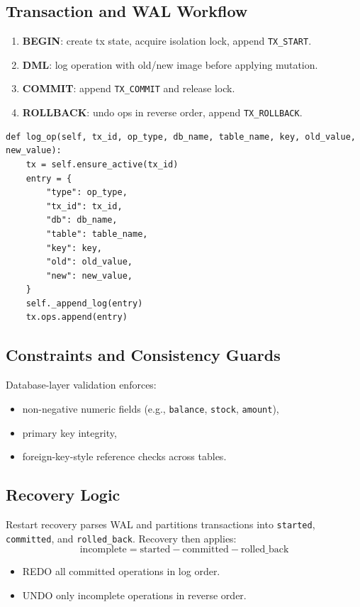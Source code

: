 \documentclass[12pt,a4paper]{article}
\begin{document}
\subsection{Transaction and WAL Workflow}
\begin{enumerate}[noitemsep]
  \item \textbf{BEGIN}: create tx state, acquire isolation lock, append \texttt{TX\_START}.
  \item \textbf{DML}: log operation with old/new image before applying mutation.
  \item \textbf{COMMIT}: append \texttt{TX\_COMMIT} and release lock.
  \item \textbf{ROLLBACK}: undo ops in reverse order, append \texttt{TX\_ROLLBACK}.
\end{enumerate}

\begin{lstlisting}[style=python, caption={WAL logging in transaction manager (Module A)}]
def log_op(self, tx_id, op_type, db_name, table_name, key, old_value, new_value):
    tx = self.ensure_active(tx_id)
    entry = {
        "type": op_type,
        "tx_id": tx_id,
        "db": db_name,
        "table": table_name,
        "key": key,
        "old": old_value,
        "new": new_value,
    }
    self._append_log(entry)
    tx.ops.append(entry)
\end{lstlisting}

\subsection{Constraints and Consistency Guards}
Database-layer validation enforces:
\begin{itemize}[noitemsep]
  \item non-negative numeric fields (e.g., \texttt{balance}, \texttt{stock}, \texttt{amount}),
  \item primary key integrity,
  \item foreign-key-style reference checks across tables.
\end{itemize}

\subsection{Recovery Logic}
Restart recovery parses WAL and partitions transactions into \texttt{started}, \texttt{committed}, and \texttt{rolled\_back}. Recovery then applies:
\[
\text{incomplete} = \text{started} - \text{committed} - \text{rolled\_back}
\]
\begin{itemize}[noitemsep]
  \item REDO all committed operations in log order.
  \item UNDO only incomplete operations in reverse order.
\end{itemize}
\end{document}
